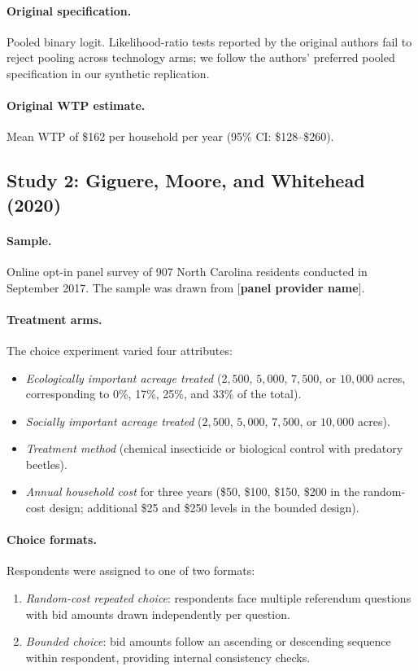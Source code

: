 \documentclass[12pt]{article}
\begin{document}
\paragraph{Original specification.} Pooled binary logit. Likelihood-ratio tests reported by the original authors fail to reject pooling across technology arms; we follow the authors' preferred pooled specification in our synthetic replication.

\paragraph{Original WTP estimate.} Mean WTP of \$162 per household per year (95\% CI: \$128--\$260).

\subsection{Study 2: Giguere, Moore, and Whitehead (2020)}

\paragraph{Sample.} Online opt-in panel survey of 907 North Carolina residents conducted in September 2017. The sample was drawn from [\textbf{panel provider name}].

\paragraph{Treatment arms.} The choice experiment varied four attributes:
\begin{itemize}[noitemsep]
    \item \textit{Ecologically important acreage treated} ($2{,}500$, $5{,}000$, $7{,}500$, or $10{,}000$ acres, corresponding to 0\%, 17\%, 25\%, and 33\% of the total).
    \item \textit{Socially important acreage treated} ($2{,}500$, $5{,}000$, $7{,}500$, or $10{,}000$ acres).
    \item \textit{Treatment method} (chemical insecticide or biological control with predatory beetles).
    \item \textit{Annual household cost} for three years (\$50, \$100, \$150, \$200 in the random-cost design; additional \$25 and \$250 levels in the bounded design).
\end{itemize}

\paragraph{Choice formats.} Respondents were assigned to one of two formats:
\begin{enumerate}[noitemsep]
    \item \textit{Random-cost repeated choice}: respondents face multiple referendum questions with bid amounts drawn independently per question.
    \item \textit{Bounded choice}: bid amounts follow an ascending or descending sequence within respondent, providing internal consistency checks.
\end{enumerate}
\end{document}
